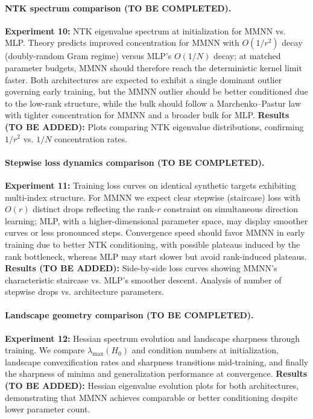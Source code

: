 \documentclass{article}
\begin{document}
\paragraph{NTK spectrum comparison (TO BE COMPLETED).}
\textbf{Experiment 10:} NTK eigenvalue spectrum at initialization for MMNN vs. MLP.
Theory predicts improved concentration for MMNN with \( O(1/r^2) \) decay (doubly-random Gram regime) versus MLP's \( O(1/N) \) decay; at matched parameter budgets, MMNN should therefore reach the deterministic kernel limit faster. Both architectures are expected to exhibit a single dominant outlier governing early training, but the MMNN outlier should be better conditioned due to the low-rank structure, while the bulk should follow a Marchenko–Pastur law with tighter concentration for MMNN and a broader bulk for MLP.
\textbf{Results (TO BE ADDED):} Plots comparing NTK eigenvalue distributions, confirming \( 1/r^2 \) vs. \( 1/N \) concentration rates.

\paragraph{Stepwise loss dynamics comparison (TO BE COMPLETED).}
\textbf{Experiment 11:} Training loss curves on identical synthetic targets exhibiting multi-index structure.
For MMNN we expect clear stepwise (staircase) loss with \( O(r) \) distinct drops reflecting the rank-\( r \) constraint on simultaneous direction learning; MLP, with a higher-dimensional parameter space, may display smoother curves or less pronounced steps. Convergence speed should favor MMNN in early training due to better NTK conditioning, with possible plateaus induced by the rank bottleneck, whereas MLP may start slower but avoid rank-induced plateaus.
\textbf{Results (TO BE ADDED):} Side-by-side loss curves showing MMNN's characteristic staircase vs. MLP's smoother descent. Analysis of number of stepwise drops vs. architecture parameters.

\paragraph{Landscape geometry comparison (TO BE COMPLETED).}
\textbf{Experiment 12:} Hessian spectrum evolution and landscape sharpness through training.
We compare \( \lambda_{\max}(H_0) \) and condition numbers at initialization, landscape convexification rates and sharpness transitions mid-training, and finally the sharpness of minima and generalization performance at convergence.
\textbf{Results (TO BE ADDED):} Hessian eigenvalue evolution plots for both architectures, demonstrating that MMNN achieves comparable or better conditioning despite lower parameter count.
\end{document}

